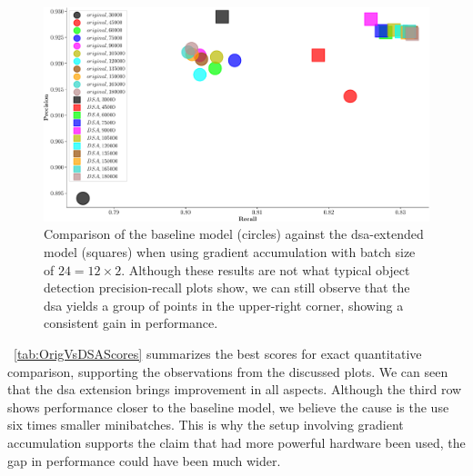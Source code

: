 \begin{figure}[t]
    \centerline{\includegraphics[width=\linewidth]{figures/siamese_tracking/tracker_cmp_160_2x12_vs_160_2x2_DSA_GA_rec_prec.pdf}}
    \caption[\gls{dsa} evaluation with gradient accumulation - secondary metrics]{Comparison of the baseline model (circles) against the \gls{dsa}-extended model (squares) when using gradient accumulation with batch size of $24 = 12 \times 2$. Although these results are not what typical object detection precision-recall plots show, we can still observe that the \gls{dsa} yields a group of points in the upper-right corner, showing a consistent gain in performance.}
    \label{fig:OrigVsDSA_160RPN_GA_Prec_Rec}
\end{figure}

\tabletext{}~\ref{tab:OrigVsDSAScores} summarizes the best scores for exact quantitative comparison, supporting the observations from the discussed plots. We can seen that the \gls{dsa} extension brings improvement in all aspects. Although the third row shows performance closer to the baseline model, we believe the cause is the use six times smaller minibatches. This is why the setup involving gradient accumulation supports the claim that had more powerful hardware been used, the gap in performance could have been much wider.


